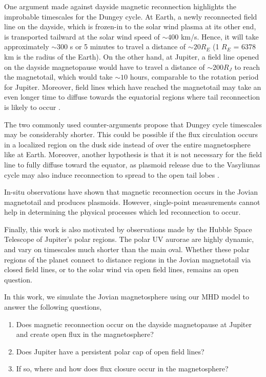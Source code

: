 One argument made against dayside magnetic reconnection highlights the improbable timescales for the Dungey cycle. At Earth, a newly reconnected field line on the dayside, which is frozen-in to the solar wind plasma at its other end, is transported tailward at the solar wind speed of $\sim400$ km/s. Hence, it will take approximately $\sim$300 s or 5 minutes to travel a distance of $\sim20 R_E$ (1 $R_E$ = 6378 km is the radius of the Earth). On the other hand, at Jupiter, a field line opened on the dayside magnetopause would have to travel a distance of $\sim200 R_J$ to reach the magnetotail, which would take  $\sim10$ hours, comparable to the rotation period for Jupiter. Moreover, field lines which have reached the magnetotail may take an even longer time to diffuse towards the equatorial regions where tail reconnection is likely to occur \cite{McComas2007}. 

The two commonly used counter-arguments propose that Dungey cycle timescales may be considerably shorter. This could be possible if the flux circulation occurs in a localized region on the dusk side instead of over the entire magnetosphere like at Earth. Moreover, another hypothesis is that it is not necessary for the field line to fully diffuse toward the equator, as plasmoid release due to the Vasyliunas cycle may also induce reconnection to spread to the open tail lobes \cite{Cowley2008}. 

In-situ observations have shown that magnetic reconnection occurs in the Jovian magnetotail and produces plasmoids. However, single-point measurements cannot help in determining the physical processes which led reconnection to occur. 

Finally, this work is also motivated by observations made by the Hubble Space Telescope of Jupiter's polar regions. The polar UV aurorae are highly dynamic, and vary on timescales much shorter than the main oval. Whether these polar regions of the planet connect to distance regions in the Jovian magnetotail via closed field lines, or to the solar wind via open field lines, remains an open question. 

In this work, we simulate the Jovian magnetosphere using our MHD model to answer the following questions,

\begin{enumerate}
    \item Does magnetic reconnection occur on the dayside magnetopause at Jupiter and create open flux in the magnetosphere?
    \item Does Jupiter have a persistent polar cap of open field lines? 
    \item If so, where and how does flux closure occur in the magnetosphere?
\end{enumerate}

